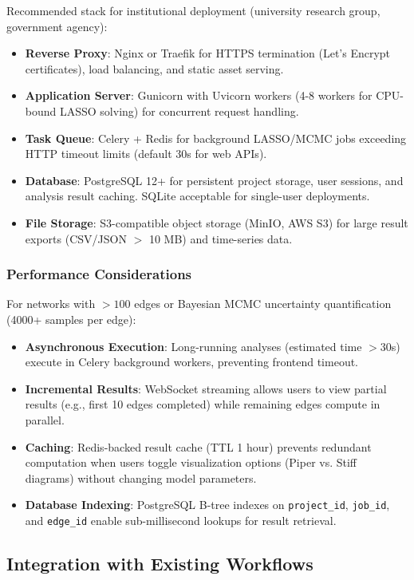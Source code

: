 Recommended stack for institutional deployment (university research group, government agency):
\begin{itemize}
	\item \textbf{Reverse Proxy}: Nginx or Traefik for HTTPS termination (Let's Encrypt certificates), load balancing, and static asset serving.
	\item \textbf{Application Server}: Gunicorn with Uvicorn workers (4-8 workers for CPU-bound LASSO solving) for concurrent request handling.
	\item \textbf{Task Queue}: Celery + Redis for background LASSO/MCMC jobs exceeding HTTP timeout limits (default 30s for web APIs).
	\item \textbf{Database}: PostgreSQL 12+ for persistent project storage, user sessions, and analysis result caching. SQLite acceptable for single-user deployments.
	\item \textbf{File Storage}: S3-compatible object storage (MinIO, AWS S3) for large result exports (CSV/JSON $>$ 10 MB) and time-series data.
\end{itemize}

\subsubsection{Performance Considerations}

For networks with $> 100$ edges or Bayesian MCMC uncertainty quantification (4000+ samples per edge):
\begin{itemize}
	\item \textbf{Asynchronous Execution}: Long-running analyses (estimated time $> 30$s) execute in Celery background workers, preventing frontend timeout.
	\item \textbf{Incremental Results}: WebSocket streaming allows users to view partial results (e.g., first 10 edges completed) while remaining edges compute in parallel.
	\item \textbf{Caching}: Redis-backed result cache (TTL 1 hour) prevents redundant computation when users toggle visualization options (Piper vs. Stiff diagrams) without changing model parameters.
	\item \textbf{Database Indexing}: PostgreSQL B-tree indexes on \texttt{project\_id}, \texttt{job\_id}, and \texttt{edge\_id} enable sub-millisecond lookups for result retrieval.
\end{itemize}

\subsection{Integration with Existing Workflows}

